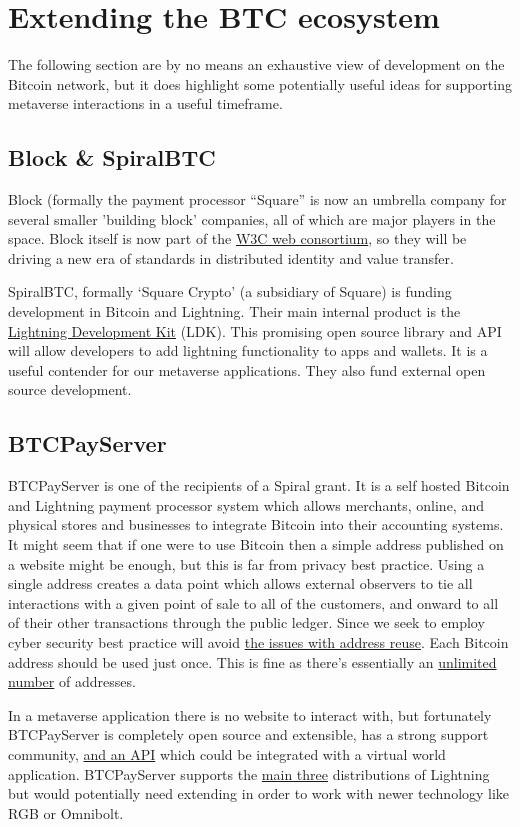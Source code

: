 \section{Extending the BTC ecosystem }
The following section are by no means an exhaustive view of development on the Bitcoin network, but it does highlight some potentially useful ideas for supporting metaverse interactions in a useful timeframe.
\subsection{Block \& SpiralBTC}
Block (formally the payment processor ``Square'' is now an umbrella company for several smaller 'building block' companies, all of which are major players in the space. Block itself is now part of the \href{https://www.w3.org/Consortium/Member/List}{W3C web consortium}, so they will be driving a new era of standards in distributed identity and value transfer.\par
SpiralBTC, formally `Square Crypto' (a subsidiary of Square) is funding development in Bitcoin and Lightning. Their main internal product is the \href{https://spiral.xyz/blog/what-were-building-lightning-development-kit/}{Lightning Development Kit} (LDK). This promising open source library and API will allow developers to add lightning functionality to apps and wallets. It is a useful contender for our metaverse applications. They also fund external open source development.\par
\subsection{BTCPayServer}
BTCPayServer is one of the recipients of a Spiral grant. It is a self hosted Bitcoin and Lightning payment processor system which allows merchants, online, and physical stores and businesses to integrate Bitcoin into their accounting systems. It might seem that if one were to use Bitcoin then a simple address published on a website might be enough, but this is far from privacy best practice. Using a single address creates a data point which allows external observers to tie all interactions with a given point of sale to all of the customers, and onward to all of their other transactions through the public ledger. Since we seek to employ cyber security best practice will avoid \href{https://en.bitcoin.it/wiki/Address_reuse}{the issues with address reuse}. Each Bitcoin address should be used just once. This is fine as there's essentially an \href{https://privacypros.io/btc-faq/how-many-btc-addresses}{unlimited number} of addresses.\par
In a metaverse application there is no website to interact with, but fortunately BTCPayServer is completely open source and extensible, has a strong support community, \href{https://docs.btcpayserver.org/API/Greenfield/v1/#operation/Invoices_CreateInvoice}{and an API} which could be integrated with a virtual world application. 
BTCPayServer supports the \href{https://docs.btcpayserver.org/LightningNetwork/}{main three} distributions of Lightning but would potentially need extending in order to work with newer technology like RGB or Omnibolt.
